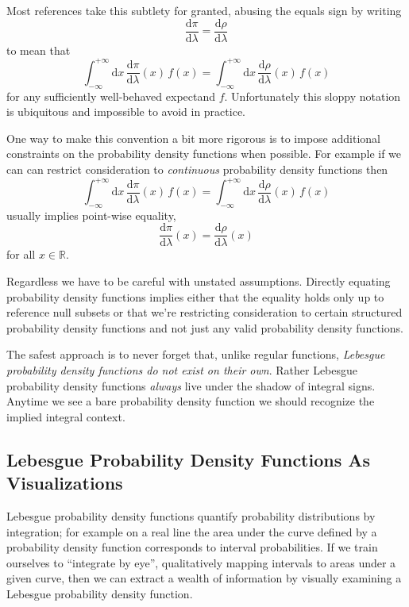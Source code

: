 \documentclass[
  letterpaper,
  DIV=11,
  numbers=noendperiod]{scrartcl}
\begin{document}
Most references take this subtlety for granted, abusing the equals sign
by writing \[
\frac{ \mathrm{d} \pi }{ \mathrm{d} \lambda}
=
\frac{ \mathrm{d} \rho }{ \mathrm{d} \lambda}
\] to mean that \[
\int_{-\infty}^{+\infty} \mathrm{d} x \,
\frac{ \mathrm{d} \pi }{ \mathrm{d} \lambda}(x)
\, f(x)
=
\int_{-\infty}^{+\infty} \mathrm{d} x \,
\frac{ \mathrm{d} \rho }{ \mathrm{d} \lambda}(x)
\, f(x)
\] for any sufficiently well-behaved expectand \(f\). Unfortunately this
sloppy notation is ubiquitous and impossible to avoid in practice.

One way to make this convention a bit more rigorous is to impose
additional constraints on the probability density functions when
possible. For example if we can can restrict consideration to
\emph{continuous} probability density functions then \[
\int_{-\infty}^{+\infty} \mathrm{d} x \,
\frac{ \mathrm{d} \pi }{ \mathrm{d} \lambda}(x)
\, f(x)
=
\int_{-\infty}^{+\infty} \mathrm{d} x \,
\frac{ \mathrm{d} \rho }{ \mathrm{d} \lambda}(x)
\, f(x)
\] usually implies point-wise equality, \[
\frac{ \mathrm{d} \pi }{ \mathrm{d} \lambda}(x)
=
\frac{ \mathrm{d} \rho }{ \mathrm{d} \lambda}(x)
\] for all \(x \in \mathbb{R}\).

Regardless we have to be careful with unstated assumptions. Directly
equating probability density functions implies either that the equality
holds only up to reference null subsets or that we're restricting
consideration to certain structured probability density functions and
not just any valid probability density functions.

The safest approach is to never forget that, unlike regular functions,
\emph{Lebesgue probability density functions do not exist on their own}.
Rather Lebesgue probability density functions \emph{always} live under
the shadow of integral signs. Anytime we see a bare probability density
function we should recognize the implied integral context.

\hypertarget{sec:visualizing}{%
\subsection{Lebesgue Probability Density Functions As
Visualizations}\label{sec:visualizing}}

Lebesgue probability density functions quantify probability
distributions by integration; for example on a real line the area under
the curve defined by a probability density function corresponds to
interval probabilities. If we train ourselves to ``integrate by eye'',
qualitatively mapping intervals to areas under a given curve, then we
can extract a wealth of information by visually examining a Lebesgue
probability density function.
\end{document}
